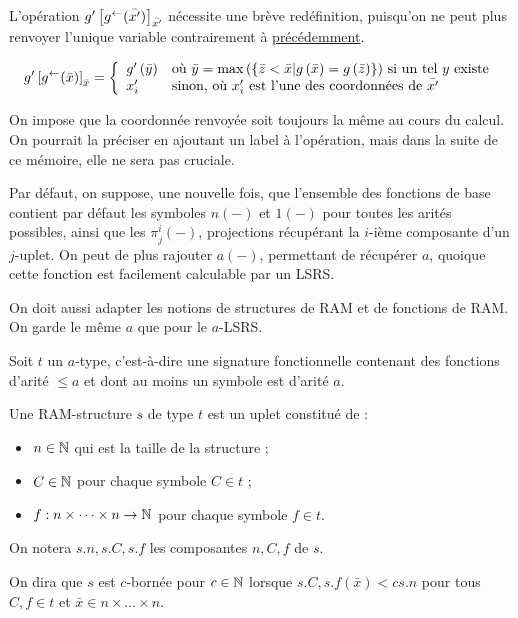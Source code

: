 			\begin{remark}
				L'opération $g'\left[ g^{\leftarrow}(\bar{x'}) \right]_{\bar{x'}}$ nécessite une brève redéfinition, puisqu'on ne peut plus renvoyer l'unique variable contrairement à \hyperref[def:app_bornee_eq_pred]{précédemment}. 
				
				\[
					g'\left[ g^{\leftarrow}(\bar{x}) \right]_{\bar{x}} = \left\lbrace \begin{array}{ll} 
													g'\left( \bar{y} \right) & \text{où $\bar{y} = \max\left( \left\lbrace \bar{z} < \bar{x} | g\left( \bar{x} \right) = g\left( \bar{z} \right) \right\rbrace \right)$ si un tel $y$ existe} \\
													x'_i & \text{sinon, où $x'_i$ est l'une des coordonnées de $\bar{x'}$}
												 \end{array} \right.
				\]
				
				On impose que la coordonnée renvoyée soit toujours la même au cours du calcul. On pourrait la préciser en ajoutant un label à l'opération, mais dans la suite de ce mémoire, elle ne sera pas cruciale.
			\end{remark}
			
			\begin{remark}
				\label{rk:fonctions_de_base_LSRS}
				Par défaut, on suppose, une nouvelle fois, que l'ensemble des fonctions de base contient par défaut les symboles $n(-)$ et $1(-)$ pour toutes les arités possibles, ainsi que les $\pi^i_j(-)$, projections récupérant la $i$-ième composante d'un $j$-uplet. On peut de plus rajouter $a(-)$, permettant de récupérer $a$, quoique cette fonction est facilement calculable par un LSRS.
			\end{remark}
			
			On doit aussi adapter les notions de structures de RAM et de fonctions de RAM. On garde le même $a$ que pour le $a$-LSRS.
			
			\begin{definition}
				\label{def:RAM_data_structures_a}
				Soit $t$ un $a$-type, c'est-à-dire une signature fonctionnelle contenant des fonctions d'arité $\leqslant a$ et dont au moins un symbole est d'arité $a$. 
				
				Une RAM-structure $s$ de type $t$ est un uplet constitué de :
				\begin{itemize}[itemsep=-1mm]
					\item 	$n \in \mathbb{N}$ qui est la taille de la structure ;
					\item 	$C \in \mathbb{N}$ pour chaque symbole $C \in t$ ;
					\item 	$f : n\times \dots \times n \to \mathbb{N}$ pour chaque symbole $f \in t$.
				\end{itemize}
				
				On notera $s.n, s.C, s.f$ les composantes $n, C, f$ de $s$.
				
				On dira que $s$ est $c$-bornée pour $c\in\mathbb{N}$ lorsque $s.C, s.f\left(\bar{x}\right) < c s.n$ pour tous $C, f \in t$ et $\bar{x} \in n\times \dots \times n$.
			\end{definition}
			

